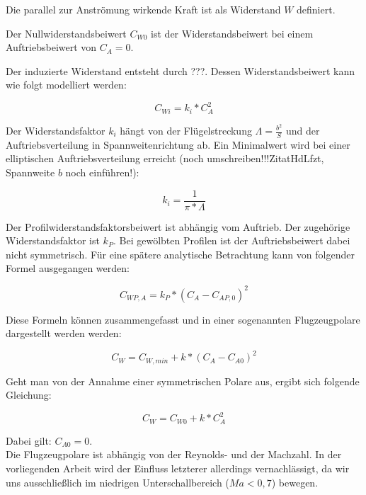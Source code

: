 Die parallel zur Anströmung wirkende Kraft ist als Widerstand $W$ definiert.

Der Nullwiderstandsbeiwert $C_{W0}$ ist der Widerstandsbeiwert bei einem Auftriebsbeiwert von $C_A=0$.

Der induzierte Widerstand entsteht durch ???. Dessen Widerstandsbeiwert kann wie folgt modelliert werden:

\begin{equation}
C_{Wi} = k_i * C^2_A
\end{equation}

Der Widerstandsfaktor $k_i$ hängt von der Flügelstreckung $\Lambda = \frac{b^2}{S}$ und der Auftriebsverteilung in Spannweitenrichtung ab. Ein Minimalwert wird bei einer elliptischen Auftriebsverteilung erreicht (noch umschreiben!!!ZitatHdLfzt, Spannweite $b$ noch einführen!):

\begin{equation}
k_i = \frac{1}{\pi * \Lambda}
\end{equation}

Der Profilwiderstandsfaktorsbeiwert ist abhängig vom Auftrieb. Der zugehörige Widerstandsfaktor ist $k_P$. Bei gewölbten Profilen ist der Auftriebsbeiwert dabei nicht symmetrisch. Für eine spätere analytische Betrachtung kann von folgender Formel ausgegangen werden:

\begin{equation}
C_{WP,A} = k_P * (C_A - C_{AP,0})^2
\end{equation}

Diese Formeln können zusammengefasst und in einer sogenannten Flugzeugpolare dargestellt werden werden:

\begin{equation}
C_{W} = C_{W,min} + k * (C_A - C_{A0})^2
\end{equation}

Geht man von der Annahme einer symmetrischen Polare aus, ergibt sich folgende Gleichung:

\begin{equation}
C_{W} = C_{W0} + k * C^2_A
\end{equation}

Dabei gilt: $C_{A0} = 0$.\\

Die Flugzeugpolare ist abhängig von der Reynolds- und der Machzahl. In der vorliegenden Arbeit wird der Einfluss letzterer allerdings vernachlässigt, da wir uns ausschließlich im niedrigen Unterschallbereich ($Ma < 0,7$) bewegen.


